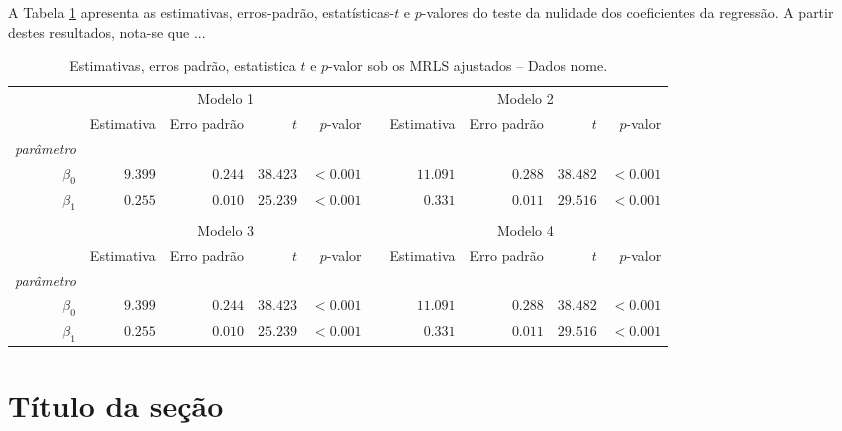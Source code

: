 \documentclass[12pt, a4paper, twoside]{article}
\numberwithin{equation}{subsection} %
\begin{document}
A Tabela \ref{tab1} apresenta as estimativas, erros-padrão, estatísticas-$t$  e $p$-valores do teste  da nulidade dos coeficientes da regressão. A partir destes resultados, nota-se que ...
\begin{table}[!htb]
	\centering
	\caption{Estimativas, erros padrão,  estatistica $t$ e $p$-valor sob os MRLS ajustados -- Dados nome.}\vspace{0.2cm}
	\label{tab1}
	\def\arraystretch{1} \begin{tabular}{rrrrrrrrrr}\hline
& \multicolumn{4}{c}{Modelo 1 }                                   && \multicolumn{4}{c}{Modelo 2 } \\  \cmidrule{2-5}\cmidrule{7-10}
& Estimativa   &Erro padrão &$t$   &$p$-valor                       && Estimativa  & Erro padrão &$t$   &$p$-valor     \\ \cmidrule{2-5}\cmidrule{7-10}
		{\it parâmetro}&&&&&&&&\\
		$\beta_0$        & $9.399$  &  $0.244$  & $38.423$  &  $<0.001$                       && $ 11.091$  &  $0.288$  & $38.482$ & $<0.001$      \\
		$\beta_1$        &  $0.255$  &  $0.010$  &  $25.239$   &  $<0.001$                       &&  $0.331$  &  $0.011$  &  $29.516$  &  $<0.001$ \\
  \cmidrule{2-5}\cmidrule{7-10}\\\hline
& \multicolumn{4}{c}{Modelo 3 }                                   && \multicolumn{4}{c}{Modelo 4 } \\  \cmidrule{2-5}\cmidrule{7-10}
& Estimativa   &Erro padrão &$t$   &$p$-valor                       && Estimativa  & Erro padrão &$t$   &$p$-valor     \\ \cmidrule{2-5}\cmidrule{7-10}
		{\it parâmetro}&&&&&&&&\\
		$\beta_0$        & $9.399$  &  $0.244$  & $38.423$  &  $<0.001$                       && $ 11.091$  &  $0.288$  & $38.482$ & $<0.001$      \\
		$\beta_1$        &  $0.255$  &  $0.010$  &  $25.239$   &  $<0.001$                       &&  $0.331$  &  $0.011$  &  $29.516$  &  $<0.001$ \\\hline
 \end{tabular}
\end{table}



\section{Título da seção}\label{Sec3}
\end{document}
